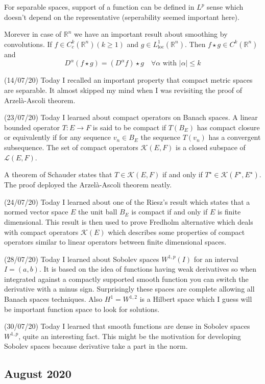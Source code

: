 \documentclass[12pt,a4paper]{article}
\newcommand{\R}{\mathbb{R}}
\begin{document}
For separable spaces, support of a function can be defined in $L^p$ sense which doesn't depend on the representative (seperability seemed important here).

Morever in case of $\R^n$ we have an important result about smoothing by convolutions.
 If $f\in C^k_c(\R^n)(k \ge 1)$ and $g \in L^1_{\text{loc}}(\R^n)$. Then $ f \star g \in C^k(\R^n)$ and 
 \[ D^\alpha(f \star g ) = (D^\alpha f )\star g \quad \forall \alpha \text{ with } |\alpha| 
 \le k \]

(14/07/20) Today I recalled an important property that compact metric spaces are separable. It almost skipped my mind when I was revisiting the proof of Arzel\`{a}-Ascoli theorem. 

(23/07/20) Today I learned about compact operators on Banach spaces. A linear bounded operator $T: E \to F$ is said to be compact if $T(B_E)$ has compact closure or equivalently if for any sequence $v_n \in B_E$ the sequence $T(v_n)$ has a convergent subsequence. The set of compact operators $\mathcal{K}(E,F)$ is a closed subspace  of $\mathcal{L}(E,F)$.

A theorem of Schauder states that $T \in \mathcal{K}(E,F)$ if and only if $T^\star \in \mathcal{K}(F^\star,E^\star)$. The proof deployed the Arzel\`{a}-Ascoli theorem neatly.

 
(24/07/20) Today I learned about one of the Riesz's result which states that a normed vector space $E$ the unit ball $B_E$ is compact if and only if $E$ is finite dimensional. This result is then used to prove Fredholm alternative which deals with compact operators $\mathcal{K}(E)$ which describes some properties of compact operators similar to linear operators between finite dimensional spaces.

(28/07/20) Today I learned about Sobolev spaces $W^{1,p}(I)$ for an interval $I = (a,b)$. It is based on the idea of functions having weak derivatives so when integrated against a compactly supported smooth function you can switch the derivative with a minus sign. Surprisingly these spaces are complete allowing all Banach spaces techniques. Also $H^1=W^{1,2}$ is a Hilbert space which I guess will be important function space to look for solutions. 

(30/07/20) Today I learned that smooth functions are dense in Sobolev spaces $W^{1,p}$, quite an interesting fact. This might be the motivation for developing Sobolev spaces because derivative take a part in the norm. 

\subsection*{August 2020}
\end{document}

